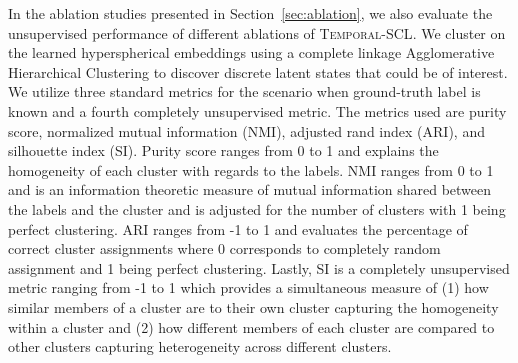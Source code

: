 \documentclass[pmlr,twocolumn,10pt]{jmlr} %
\begin{document}
In the ablation studies presented in Section~\ref{sec:ablation}, we also evaluate the unsupervised performance of different ablations of \textsc{Temporal-SCL}.
We cluster on the learned hyperspherical embeddings using a complete linkage Agglomerative Hierarchical Clustering to discover discrete latent states that could be of interest.  
We utilize three standard metrics for the scenario when ground-truth label is known and a fourth completely unsupervised metric.
The metrics used are purity score, normalized mutual information (NMI), adjusted rand index (ARI), and silhouette index (SI).
Purity score ranges from 0 to 1 and explains the homogeneity of each cluster with regards to the labels.
NMI ranges from 0 to 1 and is an information theoretic measure of mutual information shared between the labels and the cluster and is adjusted for the number of clusters with 1 being perfect clustering.
ARI ranges from -1 to 1 and evaluates the percentage of correct cluster assignments where 0 corresponds to completely random assignment and 1 being perfect clustering.
Lastly, SI is a completely unsupervised metric ranging from -1 to 1 which provides a simultaneous measure of (1) how similar members of a cluster are to their own cluster capturing the homogeneity within a cluster and (2) how different members of each cluster are compared to other clusters capturing heterogeneity across different clusters.
\end{document}
